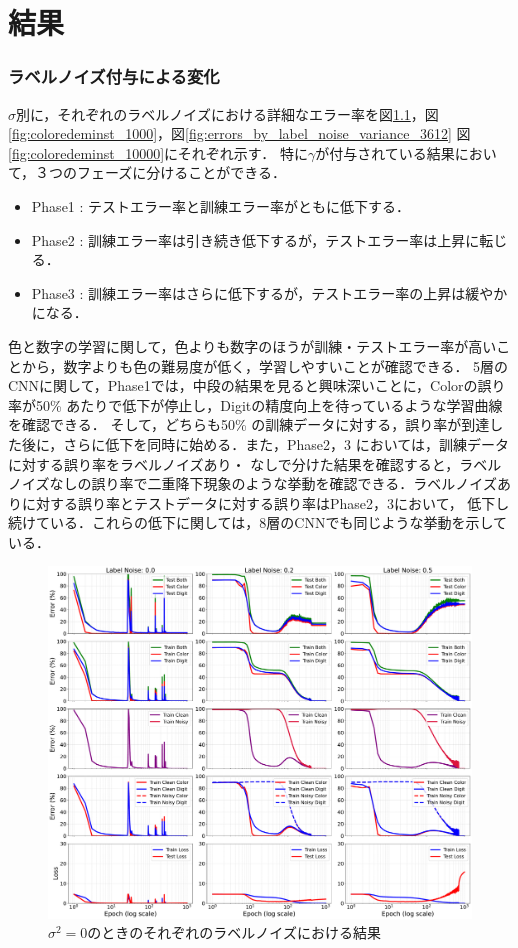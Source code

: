 \chapter{結果}
\label{chap:results}

\subsection{ラベルノイズ付与による変化}
$\sigma$別に，それぞれのラベルノイズにおける詳細なエラー率を図\ref{fig:errors_by_label_noise_variance_0}，図\ref{fig:coloredeminst_1000}，図\ref{fig:errors_by_label_noise_variance_3612}
図\ref{fig:coloredeminst_10000}にそれぞれ示す．
特に$\gamma$が付与されている結果において，３つのフェーズに分けることができる．
\begin{itemize}
    \item Phase1 : テストエラー率と訓練エラー率がともに低下する．
    \item Phase2 : 訓練エラー率は引き続き低下するが，テストエラー率は上昇に転じる．
    \item Phase3 : 訓練エラー率はさらに低下するが，テストエラー率の上昇は緩やかになる．
\end{itemize}
色と数字の学習に関して，色よりも数字のほうが訓練・テストエラー率が高いことから，数字よりも色の難易度が低く，学習しやすいことが確認できる．
5層のCNNに関して，Phase1では，中段の結果を見ると興味深いことに，Colorの誤り率が50\% あたりで低下が停止し，Digitの精度向上を待っているような学習曲線を確認できる．
そして，どちらも50\% の訓練データに対する，誤り率が到達した後に，さらに低下を同時に始める．また，Phase2，3 においては，訓練データに対する誤り率をラベルノイズあり・
なしで分けた結果を確認すると，ラベルノイズなしの誤り率で二重降下現象のような挙動を確認できる．ラベルノイズありに対する誤り率とテストデータに対する誤り率はPhase2，3において，
低下し続けている．これらの低下に関しては，8層のCNNでも同じような挙動を示している．
\begin{figure}[H]
    \centering
    \includegraphics[width=\linewidth]{fig/erroe_metrics_by_variances/error_metrics_by_label_noise_variance_0.pdf}
    \caption{$\sigma^2 = 0$のときのそれぞれのラベルノイズにおける結果}
    \label{fig:errors_by_label_noise_variance_0}
\end{figure}

